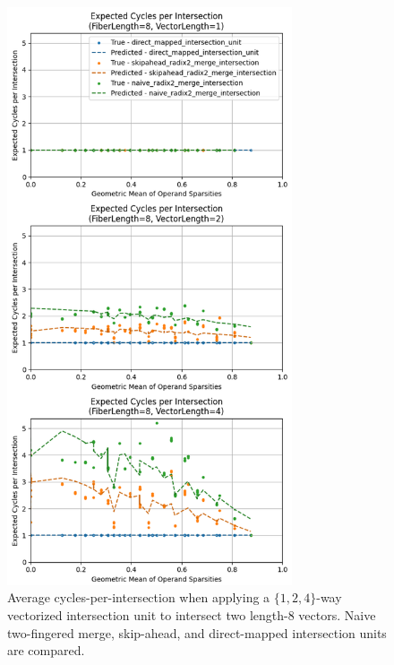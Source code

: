 \begin{figure}[H]
\includegraphics[width=0.75\textwidth]{figures/expected_cycles_F8.png}
\caption{Average cycles-per-intersection when applying a $\{1,2,4\}$-way vectorized intersection unit to intersect two length-8 vectors. Naive two-fingered merge, skip-ahead, and direct-mapped intersection units are compared.}
\label{fig:expected_cycles_F8}
\end{figure}

\newpage

